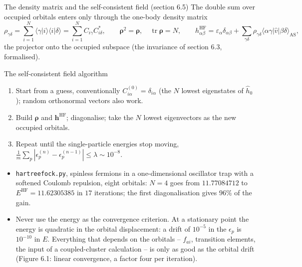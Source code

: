 \documentclass[aspectratio=169,10pt]{beamer}
\newcommand{\braket}[2]{\langle #1\vert #2\rangle}
\newcommand{\element}[3]{\langle #1\vert #2\vert #3\rangle}
\DeclareMathOperator{\tr}{tr}
\begin{document}
\begin{frame}{The density matrix and the self-consistent field (section 6.5)}
  \footnotesize
  The double sum over occupied orbitals enters only through the one-body \alert{density matrix}
  \[
    \rho_{\gamma\delta}=\sum_{i=1}^{N}\braket{\gamma}{i}\braket{i}{\delta}=\sum_{i=1}^{N}C_{i\gamma}C_{i\delta}^{*},
    \qquad
    \bm{\rho}^2=\bm{\rho},\quad\tr\bm{\rho}=N,
    \qquad
    h^{\mathrm{HF}}_{\alpha\beta}=\varepsilon_\alpha\delta_{\alpha\beta}+\sum_{\gamma\delta}\rho_{\gamma\delta}\element{\alpha\gamma}{\hat{v}}{\beta\delta}_{\mathrm{AS}},
  \]
  the projector onto the occupied subspace (the invariance of section 6.3, formalised).
  \begin{block}{The self-consistent field algorithm}
    \begin{enumerate}
      \item Start from a guess, conventionally $C^{(0)}_{i\alpha}=\delta_{i\alpha}$ (the $N$ lowest eigenstates of $\hat{h}_0$); random orthonormal vectors also work.
      \item Build $\bm{\rho}$ and $\bm{h}^{\mathrm{HF}}$; diagonalise; take the $N$ lowest eigenvectors as the new occupied orbitals.
      \item Repeat until the single-particle energies stop moving, $\frac1m\sum_p|\epsilon_p^{(n)}-\epsilon_p^{(n-1)}|\le\lambda\sim10^{-8}$.
    \end{enumerate}
  \end{block}
  \begin{itemize}
    \item \texttt{hartreefock.py}, spinless fermions in a one-dimensional oscillator trap with a softened Coulomb repulsion, eight orbitals: $N=4$ goes from $11.77084712$ to $E^{\mathrm{HF}}=11.62305385$ in $17$ iterations; the first diagonalisation gives $96\%$ of the gain.
    \item \alert{Never use the energy as the convergence criterion.} At a stationary point the energy is quadratic in the orbital displacement: a drift of $10^{-5}$ in the $\epsilon_p$ is $10^{-10}$ in $E$. Everything that depends on the orbitals -- $f_{ai}$, transition elements, the input of a coupled-cluster calculation -- is only as good as the orbital drift (Figure 6.1: linear convergence, a factor four per iteration).
  \end{itemize}
\end{frame}
\end{document}
